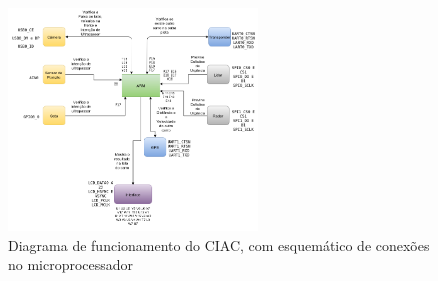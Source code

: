 \begin{figure}[h]
  \centering
  \includegraphics[width=250px, scale=1]{figuras/fluxo}
  \caption{Diagrama de funcionamento do CIAC, com esquemático de conexões no microprocessador}
\end{figure}